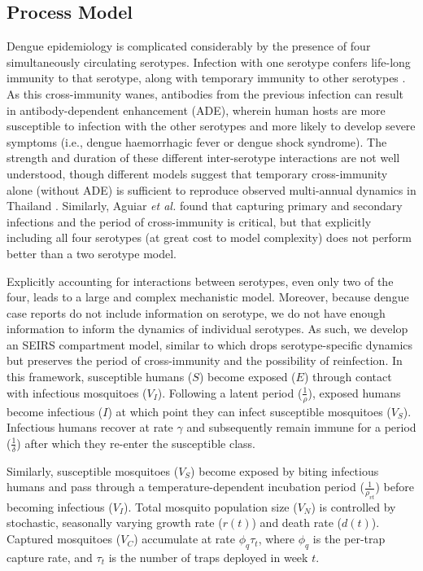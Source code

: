 \documentclass[10pt,letterpaper]{article}
\begin{document}
\subsection*{Process Model}

Dengue epidemiology is complicated considerably by the presence of four simultaneously circulating serotypes.
Infection with one serotype confers life-long immunity to that serotype, along with temporary immunity to other serotypes \cite{Wearing2006}.  
As this cross-immunity wanes, antibodies from the previous infection can result in antibody-dependent enhancement (ADE), wherein human hosts are more susceptible to infection with the other serotypes and more likely to develop severe symptoms (i.e., dengue haemorrhagic fever or dengue shock syndrome)\cite{Wearing2006}.
The strength and duration of these different inter-serotype interactions are not well understood, though different models suggest that temporary cross-immunity alone (without ADE) is sufficient to reproduce observed multi-annual dynamics in Thailand \cite{Wearing2006,Reich2013}.
Similarly, Aguiar \emph{et al.} \cite{Aguiar2013} found that capturing primary and secondary infections and the period of cross-immunity is critical, but that explicitly including all four serotypes (at great cost to model complexity) does not perform better than a two serotype model.

Explicitly accounting for interactions between serotypes, even only two of the four, leads to a large and complex mechanistic model.
Moreover, because dengue case reports do not include information on serotype, we do not have enough information to inform the dynamics of individual serotypes.
As such, we develop an SEIRS compartment model, similar to \cite{Newton1992, Burattini2008, Pinho2010} which drops serotype-specific dynamics but preserves the period of cross-immunity and the possibility of reinfection.
In this framework, susceptible humans ($S$) become exposed ($E$) through contact with infectious mosquitoes ($V_I$).
Following a latent period ($\frac{1}{\rho}$), exposed humans become infectious ($I$) at which point they can infect susceptible mosquitoes ($V_S$).
Infectious humans recover at rate $\gamma$ and subsequently remain immune for a period ($\frac{1}{\delta}$) after which they re-enter the susceptible class.

Similarly, susceptible mosquitoes ($V_S$) become exposed by biting infectious humans and pass through a temperature-dependent incubation period ($\frac{1}{\rho_{vt}}$) before becoming infectious ($V_I$).
Total mosquito population size ($V_N$) is controlled by stochastic, seasonally varying growth rate ($r(t)$) and death rate ($d(t)$).
Captured mosquitoes ($V_C$) accumulate at rate $\phi_q \tau_t$, where $\phi_q$ is the per-trap capture rate, and $\tau_t$ is the number of traps deployed in week $t$.
\end{document}
